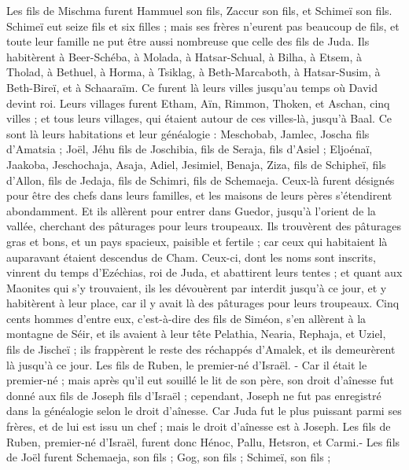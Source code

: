 \begin{multicols}{2}
Les fils de Mischma furent Hammuel son fils, Zaccur son fils, et Schimeï son fils.
Schimeï eut seize fils et six filles ; mais ses frères n'eurent pas beaucoup de fils, et toute leur famille ne put être aussi nombreuse que celle des fils de Juda.
Ils habitèrent à Beer-Schéba, à Molada, à Hatsar-Schual,
à Bilha, à Etsem, à Tholad,
à Bethuel, à Horma, à Tsiklag,
à Beth-Marcaboth, à Hatsar-Susim, à Beth-Bireï, et à Schaaraïm. Ce furent là leurs villes jusqu'au temps où David devint roi.
Leurs villages furent Etham, Aïn, Rimmon, Thoken, et Aschan, cinq villes ;
et tous leurs villages, qui étaient autour de ces villes-là, jusqu'à Baal. Ce sont là leurs habitations et leur généalogie :
Meschobab, Jamlec, Joscha fils d'Amatsia ;
Joël, Jéhu fils de Joschibia, fils de Seraja, fils d'Asiel ;
Eljoénaï, Jaakoba, Jeschochaja, Asaja, Adiel, Jesimiel, Benaja,
Ziza, fils de Schipheï, fils d'Allon, fils de Jedaja, fils de Schimri, fils de Schemaeja.
Ceux-là furent désignés pour être des chefs dans leurs familles, et les maisons de leurs pères s’étendirent abondamment.
Et ils allèrent pour entrer dans Guedor, jusqu'à l'orient de la vallée, cherchant des pâturages pour leurs troupeaux.
Ils trouvèrent des pâturages gras et bons, et un pays spacieux, paisible et fertile ; car ceux qui habitaient là auparavant étaient descendus de Cham.
Ceux-ci, dont les noms sont inscrits, vinrent du temps d'Ezéchias, roi de Juda, et abattirent leurs tentes ; et quant aux Maonites qui s’y trouvaient, ils les dévouèrent par interdit jusqu'à ce jour, et y habitèrent à leur place, car il y avait là des pâturages pour leurs troupeaux.
Cinq cents hommes d'entre eux, c'est-à-dire des fils de Siméon, s'en allèrent à la montagne de Séir, et ils avaient à leur tête Pelathia, Nearia, Rephaja, et Uziel, fils de Jischeï ;
ils frappèrent le reste des réchappés d'Amalek, et ils demeurèrent là jusqu'à ce jour.
\VerseOne{}Les fils de Ruben, le premier-né d'Israël. - Car il était le premier-né ; mais après qu'il eut souillé le lit de son père, son droit d'aînesse fut donné aux fils de Joseph fils d'Israël ; cependant, Joseph ne fut pas enregistré  dans la généalogie selon le droit d'aînesse.
Car Juda fut le plus puissant parmi ses frères, et de lui est issu un chef ; mais le droit d'aînesse est à Joseph.
Les fils de Ruben, premier-né d'Israël, furent donc Hénoc, Pallu, Hetsron, et Carmi.-
Les fils de Joël furent  Schemaeja, son fils ; Gog, son fils ; Schimeï, son fils ;

\end{multicols}
